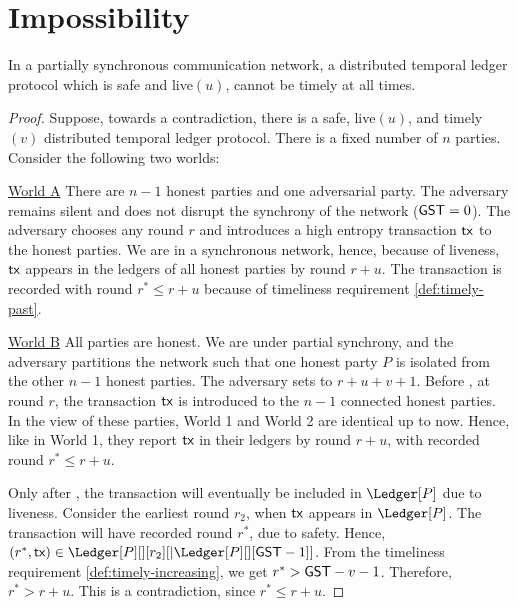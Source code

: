\section{Impossibility}

\begin{theorem}
  In a partially synchronous communication network, a distributed temporal ledger protocol
  which is safe and live$(u)$, cannot be timely at all times.
\end{theorem}
\begin{proof}
  Suppose, towards a contradiction, there is a safe, live$(u)$, and timely$(v)$ distributed temporal ledger protocol.
  There is a fixed number of $n$ parties.
  Consider the following two worlds:

  \noindent
  \underline{World A}
  There are $n-1$ honest parties and one adversarial party. The adversary remains silent and
  does not disrupt the synchrony of the network ($\textsf{GST} = 0$).
  The adversary chooses any round $r$ and introduces a high entropy transaction $\textsf{tx}$ to the honest parties. We are in a
  synchronous network, hence, because of liveness, $\textsf{tx}$ appears in the ledgers of all honest parties
  by round $r + u$. The transaction is recorded with round $r^* \leq r + u$ because of
  timeliness requirement \ref{def:timely-past}.

  \noindent
  \underline{World B}
  All parties are honest. We are under partial synchrony, and the adversary partitions the network such that
  one honest party $P$ is isolated from the other $n-1$ honest parties.
  The adversary sets \gst to  $r + u + v + 1$.
  Before \gst, at round $r$, the transaction $\textsf{tx}$ is introduced to the $n-1$ connected
  honest parties. In the view of these parties,
  World 1 and World 2 are identical up to now. Hence, like in World 1,
  they report $\textsf{tx}$ in their ledgers by round $r + u$, with recorded round $r^* \leq r + u$.

  Only after \gst, the transaction will eventually be included in $\Ledger[P]$ due to liveness.
  Consider the earliest round $r_2$, when $\textsf{tx}$ appears in $\Ledger[P]$.
  The transaction will have recorded round $r^*$, due to safety.
  Hence, $(r^*, \tx) \in \Ledger[P][][r_2][|\Ledger[P][][\gst - 1]]$.
  From the timeliness requirement \ref{def:timely-increasing}, we
  get $r^* > \textsf{GST} - v - 1$. Therefore, $r^* > r + u$.
  This is a contradiction, since $r^* \leq r + u$.
\end{proof}
